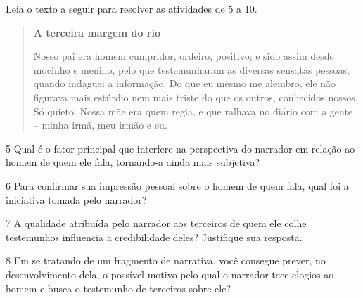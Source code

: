 
Leia o texto a seguir para resolver as atividades de 5 a 10.

\begin{quote}
\centering\textbf{A terceira margem do rio}


Nosso pai era homem cumpridor, ordeiro, positivo; e sido assim desde
mocinho e menino, pelo que testemunharam as diversas sensatas pessoas,
quando indaguei a informação. Do que eu mesmo me alembro, ele não
figurava mais estúrdio nem mais triste do que os outros, conhecidos
nossos. Só quieto. Nossa mãe era quem regia, e que ralhava no diário com
a gente -- minha irmã, meu irmão e eu.

\end{quote}

\num{5} Qual é o fator principal que interfere na perspectiva do
narrador em relação ao homem de quem ele fala, tornando-a ainda mais
subjetiva?


\num{6} Para confirmar sua impressão pessoal sobre o homem de quem fala,
qual foi a iniciativa tomada pelo narrador?


\num{7} A qualidade atribuída pelo narrador aos terceiros de quem ele
colhe testemunhos influencia a credibilidade deles? Justifique sua
resposta.


\num{8} Em se tratando de um fragmento de narrativa, você consegue
prever, no desenvolvimento dela, o possível motivo pelo qual o narrador
tece elogios ao homem e busca o testemunho de terceiros sobre ele?


